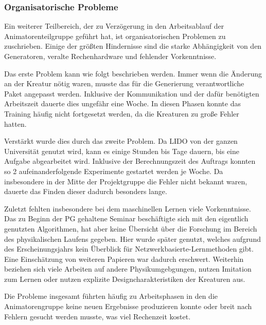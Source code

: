 
\subsubsection{Organisatorische Probleme}
Ein weiterer Teilbereich, der zu Verzögerung in den Arbeitsablauf der Animatorenteilgruppe geführt hat, ist organisatorischen Problemen zu zuschrieben. Einige der größten Hindernisse sind die starke Abhängigkeit von den Generatoren, veralte Rechenhardware und fehlender Vorkenntnisse.

Das erste Problem kann wie folgt beschrieben werden. Immer wenn die Änderung an der Kreatur nötig waren, musste das für die Generierung verantwortliche Paket angepasst werden. Inklusive der Kommunikation und der dafür benötigten Arbeitszeit dauerte dies ungefähr eine Woche. In diesen Phasen konnte das Training häufig nicht fortgesetzt werden, da die Kreaturen zu große Fehler hatten. 

Verstärkt wurde dies durch das zweite Problem. Da LIDO von der ganzen Universität genutzt wird, kann es einige Stunden bis Tage dauern, bis eine Aufgabe abgearbeitet wird. Inklusive der Berechnungszeit des Auftrags konnten so 2 aufeinanderfolgende Experimente gestartet werden je Woche. Da insbesondere in der Mitte der Projektgruppe die Fehler nicht bekannt waren, dauerte das Finden dieser dadurch besonders lange. 

Zuletzt fehlten insbesondere bei dem maschinellen Lernen viele Vorkenntnisse. Das zu Beginn der PG gehaltene Seminar beschäftigte sich mit den eigentlich genutzten Algorithmen, hat aber keine Übersicht über die Forschung im Bereich des physikalischen Laufens gegeben. Hier wurde später \cite{Geijtenbeek2012} genutzt, welches aufgrund des Erscheinungsjahrs kein Überblick für Netzwerkbasierte-Lernmethoden gibt. Eine Einschätzung von weiteren Papieren war dadurch erschwert. Weiterhin beziehen sich viele Arbeiten auf andere Physikumgebgungen, nutzen Imitation zum Lernen oder nutzen explizite Designcharakteristiken der Kreaturen aus\cite{Mourot2022}.

Die Probleme insgesamt führten häufig zu Arbeitsphasen in den die Animatorengruppe keine neuen Ergebnisse produzieren konnte oder breit nach Fehlern gesucht werden musste, was viel Rechenzeit kostet.

